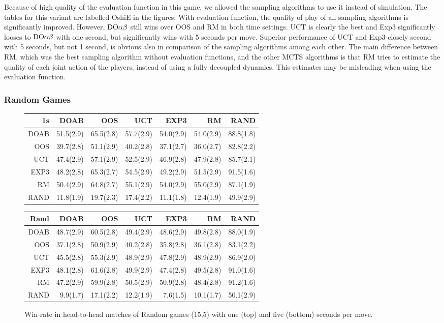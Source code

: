 Because of high quality of the evaluation function in this game, we allowed the sampling algorithms to use it instead of simulation.
The tables for this variant are labelled OshiE in the figures. With evaluation function, the quality of play of all sampling algorithms is significantly improved. However, $\textrm{DO}\alpha\beta$ still wins over OOS and RM in both time settings.
UCT is clearly the best and Exp3 significantly looses to $\textrm{DO}\alpha\beta$ with one second, but significantly wins with 5 seconds per move.
Superior performance of UCT and Exp3 closely second with 5 seconds, but not 1 second, is obvious also in comparison of the sampling algorithms among each other.
The main difference between RM, which was the best sampling algorithm without evaluation functions, and the other MCTS algorithms is that RM tries to estimate the quality of each joint action of the players, instead of using a fully decoupled dynamics.
This estimates may be misleading when using the evaluation function.


\subsubsection{Random Games}
\begin{figure}
\centering
\begin{scriptsize}
\begin{tabular}{|r|rrrrrr|}\hline
1s&DOAB&OOS&UCT&EXP3&RM&RAND\\\hline
DOAB&51.5(2.9)&65.5(2.8)&57.7(2.9)&54.0(2.9)&54.0(2.9)&88.8(1.8)\\
OOS&39.7(2.8)&51.1(2.9)&40.2(2.8)&37.1(2.7)&36.0(2.7)&82.8(2.2)\\
UCT&47.4(2.9)&57.1(2.9)&52.5(2.9)&46.9(2.8)&47.9(2.8)&85.7(2.1)\\
EXP3&48.2(2.8)&65.3(2.7)&54.5(2.9)&49.2(2.9)&51.5(2.9)&91.5(1.6)\\
RM&50.4(2.9)&64.8(2.7)&55.1(2.9)&54.0(2.9)&55.0(2.9)&87.1(1.9)\\
RAND&11.8(1.9)&19.7(2.3)&17.4(2.2)&11.1(1.8)&12.4(1.9)&49.9(2.9)\\
\hline
\end{tabular}
\begin{tabular}{|r|rrrrrr|}\hline
Rand&DOAB&OOS&UCT&EXP3&RM&RAND\\\hline
DOAB&48.7(2.9)&60.5(2.8)&49.4(2.9)&48.6(2.9)&49.8(2.8)&88.0(1.9)\\
OOS&37.1(2.8)&50.9(2.9)&40.2(2.8)&35.8(2.8)&36.1(2.8)&83.1(2.2)\\
UCT&45.5(2.8)&55.3(2.9)&48.9(2.9)&47.8(2.9)&48.9(2.9)&86.9(2.0)\\
EXP3&48.1(2.8)&61.6(2.8)&49.9(2.9)&47.4(2.8)&49.5(2.8)&91.0(1.6)\\
RM&47.2(2.9)&59.9(2.8)&50.5(2.9)&50.9(2.8)&48.4(2.8)&91.2(1.6)\\
RAND&9.9(1.7)&17.1(2.2)&12.2(1.9)&7.6(1.5)&10.1(1.7)&50.1(2.9)\\
\hline
\end{tabular}

\end{scriptsize}
\caption{Win-rate in head-to-head matches of Random games (15,5) with one (top) and five (bottom) seconds per move.}\label{fig:matches:rand}
\end{figure}


